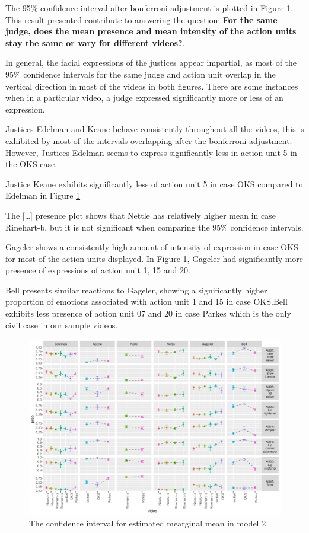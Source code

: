 \documentclass{monashthesis}
\begin{document}
The 95\% confidence interval after bonferroni adjustment is plotted in Figure \ref{fig:model2-plot}. This result presented contribute to answering the question: \textbf{For the same judge, does the mean presence and mean intensity of the action units stay the same or vary for different videos?}.

In general, the facial expressions of the justices appear impartial, as most of the 95\% confidence intervals for the same judge and action unit overlap in the vertical direction in most of the videos in both figures. There are some instances when in a particular video, a judge expressed significantly more or less of an expression.

Justices Edelman and Keane behave consistently throughout all the videos, this is exhibited by most of the intervals overlapping after the bonferroni adjustment. However, Justices Edelman seems to express significantly less in action unit 5 in the OKS case.

Justice Keane exhibits significantly less of action unit 5 in case OKS compared to Edelman in Figure \ref{fig:model2-plot}

The {[}\ldots{}{]} presence plot shows that Nettle has relatively higher mean in case Rinehart-b, but it is not significant when comparing the 95\% confidence intervals.

Gageler shows a consistently high amount of intensity of expression in case OKS for most of the action units displayed. In Figure \ref{fig:model2-plot}, Gageler had significantly more presence of expressions of action unit 1, 15 and 20.

Bell presents similar reactions to Gageler, showing a significantly higher proportion of emotions associated with action unit 1 and 15 in case OKS.Bell exhibits less presence of action unit 07 and 20 in case Parkes which is the only civil case in our sample videos.

\begin{figure}

{\centering \includegraphics[width=1\linewidth]{figures/model2-plot-1} 

}

\caption{The confidence interval for estimated mearginal mean in model 2}\label{fig:model2-plot}
\end{figure}
\end{document}
